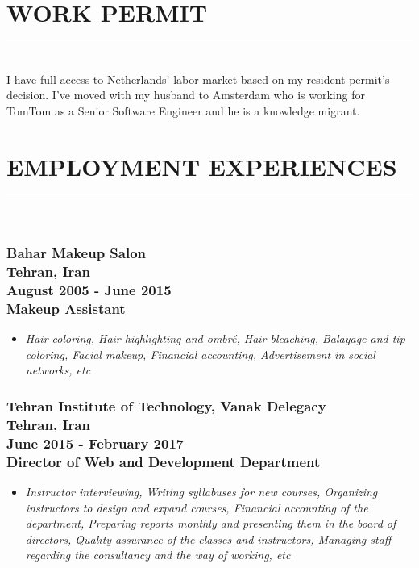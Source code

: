 \documentclass[10pt,a4paper]{article}
\begin{document}
\section{WORK PERMIT}
\noindent \rule {3.7cm}{0.4pt} \\
    I have full access to Netherlands' labor market based on my resident permit's decision. I've moved with my husband to Amsterdam who is working for TomTom as a Senior Software Engineer and he is a knowledge migrant.
    
\section{EMPLOYMENT EXPERIENCES}
\noindent \rule {7.2cm}{0.4pt} \\
\subsubsection{{\large Bahar Makeup Salon} \\ \textnormal{Tehran, Iran} \\ \textnormal{August 2005 - June 2015} \\ {Makeup Assistant}}
  \setlength{\leftskip}{0.5cm}
  \setlength{\rightskip}{1cm}
  \begin{itemize}
    \setlength{\rightskip}{1cm}
    \setlength\itemsep{0em}
    \item \small \textit {Hair coloring, Hair highlighting and ombr\'e, Hair bleaching, Balayage and tip coloring, Facial makeup, Financial accounting, Advertisement in social networks, etc}
  \end{itemize}
  \setlength{\leftskip}{0pt}
  \setlength{\rightskip}{0cm}
  
\subsubsection{{\large Tehran Institute of Technology, Vanak Delegacy} \\ \textnormal{Tehran, Iran} \\ \textnormal{June 2015 - February 2017} \\ {Director of Web and Development Department}}
  \setlength{\leftskip}{0.5cm}
  \setlength{\rightskip}{1cm}
  \begin{itemize}
    \setlength{\rightskip}{1cm}
    \setlength\itemsep{0em}
    \item \small \textit {Instructor interviewing, Writing syllabuses for new courses, Organizing instructors to design and expand courses, Financial accounting of the department, Preparing reports monthly and presenting them in the board of directors, Quality assurance of the classes and instructors, Managing staff regarding the consultancy and the way of working, etc}
  \end{itemize}
  \setlength{\leftskip}{0pt}
  \setlength{\rightskip}{0cm}
  
\end{document}
